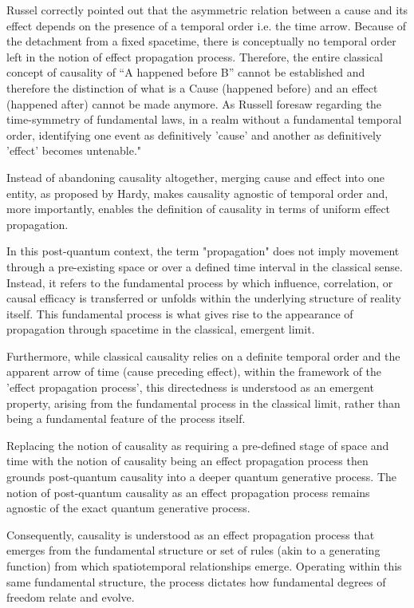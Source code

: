 Russel correctly pointed out that the asymmetric relation between a cause and its effect depends on the presence of a temporal order i.e. the time arrow. Because of the detachment from a fixed spacetime, there is conceptually no temporal order left in the notion of effect propagation process. Therefore, the entire classical concept of causality of “A happened before B” cannot be established and therefore the distinction of what is a Cause (happened before) and an effect (happened after) cannot be made anymore. As Russell foresaw regarding the time-symmetry of fundamental laws, in a realm without a fundamental temporal order, identifying one event as definitively 'cause' and another as definitively 'effect' becomes untenable."

Instead of abandoning causality altogether, merging cause and effect into one entity, as proposed by Hardy\cite{hardy2005probability}, makes causality agnostic of temporal order and, more importantly, enables the definition of causality in terms of uniform effect propagation. 

In this post-quantum context, the term "propagation" does not imply movement through a pre-existing space or over a defined time interval in the classical sense. Instead, it refers to the fundamental process by which influence, correlation, or causal efficacy is transferred or unfolds within the underlying structure of reality itself. This fundamental process is what gives rise to the appearance of propagation through spacetime in the classical, emergent limit.

Furthermore, while classical causality relies on a definite temporal order and the apparent arrow of time (cause preceding effect), within the framework of the 'effect propagation process', this directedness is understood as an emergent property, arising from the fundamental process in the classical limit, rather than being a fundamental feature of the process itself.

Replacing the notion of causality as requiring a pre-defined stage of space and time with the notion of causality being an effect propagation process then grounds post-quantum causality into a deeper quantum generative process. The notion of post-quantum causality as an effect propagation process remains agnostic of the exact quantum generative process. 

Consequently, causality is understood as an effect propagation process that emerges from the fundamental structure or set of rules (akin to a generating function) from which spatiotemporal relationships emerge. Operating within this same fundamental structure, the process dictates how fundamental degrees of freedom relate and evolve.

